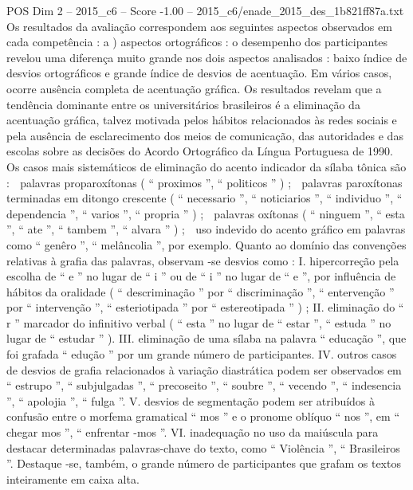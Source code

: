 \begin{textsample}{POS Dim 2 – 2015\_c6 – Score -1.00 – 2015\_c6/enade\_2015\_des\_1b821ff87a.txt}
Os resultados da avaliação correspondem aos seguintes aspectos observados em cada competência : a ) aspectos ortográficos : o desempenho dos participantes revelou uma diferença muito grande nos dois aspectos analisados : baixo índice de desvios ortográficos e grande índice de desvios de acentuação.
Em vários casos, ocorre ausência completa de acentuação gráfica.
Os resultados revelam que a tendência dominante entre os universitários brasileiros é a eliminação da acentuação gráfica, talvez motivada pelos hábitos relacionados às redes sociais e pela ausência de esclarecimento dos meios de comunicação, das autoridades e das escolas sobre as decisões do Acordo Ortográfico da Língua Portuguesa de 1990.
Os casos mais sistemáticos de eliminação do acento indicador da sílaba tônica são :  palavras proparoxítonas ( “ proximos ”, “ politicos ” ) ;  palavras paroxítonas terminadas em ditongo crescente ( “ necessario ”, “ noticiarios ”, “ individuo ”, “ dependencia ”, “ varios ”, “ propria ” ) ;  palavras oxítonas ( “ ninguem ”, “ esta ”, “ ate ”, “ tambem ”, “ alvara ” ) ;  uso indevido do acento gráfico em palavras como “ genêro ”, “ melâncolia ”, por exemplo.
Quanto ao domínio das convenções relativas à grafia das palavras, observam -se desvios como : I. hipercorreção pela escolha de “ e ” no lugar de “ i ” ou de “ i ” no lugar de “ e ”, por influência de hábitos da oralidade ( “ descriminação ” por “ discriminação ”, “ entervenção ” por “ intervenção ”, “ esteriotipada ” por “ estereotipada ” ) ; II. eliminação do “ r ” marcador do infinitivo verbal ( “ esta ” no lugar de “ estar ”, “ estuda ” no lugar de “ estudar ” ).
III. eliminação de uma sílaba na palavra “ educação ”, que foi grafada “ edução ” por um grande número de participantes.
IV. outros casos de desvios de grafia relacionados à variação diastrática podem ser observados em “ estrupo ”, “ subjulgadas ”, “ precoseito ”, “ soubre ”, “ vecendo ”, “ indesencia ”, “ apolojia ”, “ fulga ”.
V. desvios de segmentação podem ser atribuídos à confusão entre o morfema gramatical “ mos ” e o pronome oblíquo “ nos ”, em “ chegar mos ”, “ enfrentar -mos ”.
VI. inadequação no uso da maiúscula para destacar determinadas palavras-chave do texto, como “ Violência ”, “ Brasileiros ”.
Destaque -se, também, o grande número de participantes que grafam os textos inteiramente em caixa alta.

\end{textsample}
